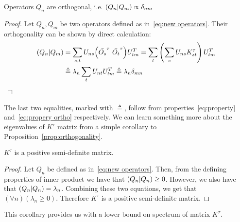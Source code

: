 \begin{proposition}
Operators \(Q_n\) are orthogonal, i.e. \(\left(Q_n \middle| Q_m\right) \propto \delta_{nm}\)
\label{prop:orthogonality}
\end{proposition}
\begin{proof}
  Let \(Q_n,Q_m\) be two operators defined as in~\eqref{eq:new operators}.
  Their orthogonality can be shown by direct calculation:
  \begin{align*}
    \left(Q_n \middle| Q_m\right) &= \sum_{s,t} U_{ns} {\left(\bar{O_s}^{\tau} \middle| \bar{O_t}^{\tau}\right)} U_{tm}^{T} 
    = \sum_{t} \left(\sum_{s}U_{ns} K_{st}^{\tau}\right)  U_{tm}^{T} \\ 
    &\triangleq \lambda_n \sum_t U_{nt} U_{tm}^{T} \triangleq \lambda_n \delta_{mn}
  \end{align*}
\end{proof}
The last two equalities, marked with \(\triangleq \), follow from properties~\eqref{eq:property} 
and~\eqref{eq:propery ortho} respectively. We can learn something more
about the eigenvalues of \(K^{\tau}\) matrix from a simple corollary to Proposition~\ref{prop:orthogonality}.
\begin{corollary}
  \(K^{\tau}\) is a positive semi-definite matrix.\label{corr:psd}
\end{corollary}
\begin{proof}
Let \(Q_n\) be defined as in~\eqref{eq:new operators}. Then, from the defining properties of inner product we have that
\(\left(Q_n \middle| Q_n\right) \geq 0\). However, we also have that \(\left(Q_n \middle| Q_n\right) = \lambda_n\). Combining these two equations, we get
that \(\left(\forall n\right) \left(\lambda_n \geq 0\right)\). Therefore \(K^{\tau}\) is a positive semi-definite matrix.
\end{proof}
This corollary provides us with a lower bound on spectrum of matrix \(K^{\tau}\). 

